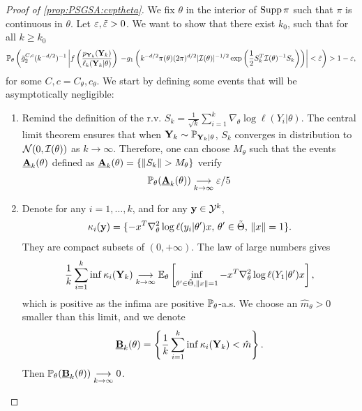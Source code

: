 \begin{proof}[Proof of \cref{prop:PSGSA:cvptheta}]
    We fix $\theta$ in the interior of $\operatorname{Supp}\pi$ such that $\pi$ is continuous in $\theta$. Let $\varepsilon,\tilde{\varepsilon}>0$. We want to show that there exist $k_0$, such that for all $k\geq k_0$
        \begin{equation}
            \mathbb{P}_\theta\left(\tilde g_2^{C,c}(k^{-d/2})^{-1}\left| f\left(\frac{p_{\mathbf{Y}_k}(\mathbf{Y}_k)}{\ell_k(\mathbf{Y}_k|\theta)}\right) \right.            \left. - g_1\left(k^{-d/2}\pi(\theta)(2\pi)^{d/2}|\mathcal{I}(\theta)|^{-1/2}\exp\left(\frac{1}{2}S_k^T\mathcal{I}(\theta)^{-1}S_k \right)\right) \right|<\tilde{\varepsilon}   \right)>1-\varepsilon,
        \end{equation}
    for some $C,c = C_\theta,c_\theta$.
    We start by defining some events that 
    will be asymptotically negligible:
    \begin{enumerate}
    \item Remind the definition of the r.v. $S_k=\frac{1}{\sqrt{k}}\sum_{i=1}^k\nabla_\theta\log\ell(Y_i|\theta)$. The central limit theorem ensures that when $\mathbf{Y}_k\sim\mathbb{P}_{\mathbf{Y}_k|\theta}$, $S_k$ converges in distribution to $\mathcal{N}(0,\mathcal{I}(\theta))$ as $k\to\infty$. Therefore, one can choose $M_\theta$ such that the events $ \underline{\mathbf{A}}_k(\theta)$ defined as $ \underline{\mbf A}_k(\theta)=\{\|S_k\|>M_\theta\}$ verify
        \begin{equation}
            \mathbb{P}_\theta( \underline{\mathbf{A}}_k(\theta))\overset{\ }{\underset{k\rightarrow\infty}{\longrightarrow}}\varepsilon/5
        \end{equation}
    
        \item Denote for any $i=1,\dots,k$, and for any $\mathbf{y} \in\mathcal{Y}^k$,
        \begin{equation}
            \kappa_i(\mathbf{y})=\{-x^T\nabla^2_\theta\log\ell(y_i|\theta')x,\,\theta'\in\tilde\Theta,\,\|x\|=1\}.
        \end{equation}
     They are compact subsets of $(0,+\infty)$. The law of large numbers gives 
     \begin{equation}
        \frac{1}{k}\sum_{i=1}^k\inf \kappa_i(\mathbf{Y}_k)\overset{\ }{\underset{k\rightarrow\infty}{\longrightarrow}}\mathbb{E}_\theta\left[\inf_{\theta'\in\tilde\Theta,\|x\|=1}-x^T\nabla^2_\theta\log\ell(Y_1|\theta')x\right]  ,
     \end{equation}
    which is positive as the infima are positive $\mathbb{P}_\theta$-a.s. We choose an $\hat m_\theta>0$ smaller than this limit, and we denote
        \begin{equation}
             \underline{\mathbf{B}}_k(\theta)=\left\{\frac{1}{k}\sum_{i=1}^k\inf \kappa_i(\mathbf{Y}_k)<\hat m\right\}.       
        \end{equation}
     Then $\mathbb{P}_\theta( \underline{\mathbf{B}}_k(\theta))\overset{\ }{\underset{k\rightarrow\infty}{\longrightarrow}}0$.


\end{enumerate}
\end{proof}
